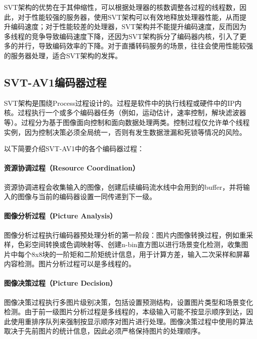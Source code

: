   SVT架构的优势在于其伸缩性，可以根据处理器的核数调整各过程的线程数，因此，对于性能较强的服务器，使用SVT架构可以有效地释放处理器性能，从而提升编码速度；对于性能较差的处理器，SVT架构并不能提升编码速度，反而因为多线程的竞争导致编码速度下降，还因为SVT架构拆分了编码器内核，引入了更多的并行，导致编码效率的下降。对于直播转码服务的场景，往往会使用性能较强的服务器处理，适合SVT架构的发挥。

\subsection{SVT-AV1编码器过程}
  SVT架构是围绕Process过程设计的\cite{EncoderDesignSVTAV1}。过程是软件中的执行线程或硬件中的IP内核。过程执行一个或多个编码器任务（例如，运动估计，速率控制，解块滤波器等）。过程分为基于图像面向控制和面向数据处理两类。控制过程仅允许单个线程实例，因为控制决策必须全局统一，否则有发生数据泄漏和死锁等情况的风险。

  以下简要介绍SVT-AV1中的各个编码器过程：
  \paragraph{资源协调过程（Resource Coordination）} 资源协调进程会收集输入的图像，创建后续编码流水线中会用到的buffer，并将输入的图像与当前的编码器设置一同传递到下一级。

  \paragraph{图像分析过程（Picture Analysis）} 图像分析过程执行编码器预处理分析的第一阶段：图片内图像转换过程，例如重采样，色彩空间转换或色调映射等、创建n-bin直方图以进行场景变化检测，收集图片中每个8x8块的一阶矩和二阶矩统计信息，用于计算方差，输入二次采样和屏幕内容检测。图片分析过程可以是多线程的。

  \paragraph{图像决策过程（Picture Decision）} 图像决策过程执行多图片级别决策，包括设置预测结构，设置图片类型和场景变化检测。由于前一级图片分析过程是多线程的，本级输入可能不按显示顺序到达，因此使用重排序队列来强制按显示顺序对图片进行处理。图像决策过程中使用的算法取决于先前图片的统计信息，因此必须严格保持图片的处理顺序。

